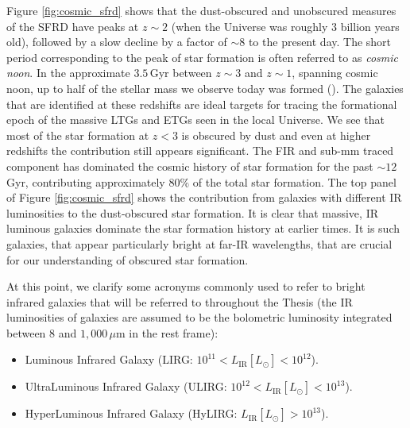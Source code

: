 Figure \ref{fig:cosmic_sfrd} shows that the dust-obscured and unobscured measures of the SFRD have peaks at $z\sim2$ (when the Universe was roughly $3$ billion years old), followed by a slow decline by a factor of $\sim 8$ to the present day. The short period corresponding to the peak of star formation is often referred to as \textit{cosmic noon}. In the approximate $3.5\,$Gyr between $z\sim3$ and $z\sim1$, spanning cosmic noon, up to half of the stellar mass we observe today was formed (\citealt{Forster-Schreiber_2020}). The galaxies that are identified at these redshifts are ideal targets for tracing the formational epoch of the massive LTGs and ETGs seen in the local Universe. We see that most of the star formation at $z < 3$ is obscured by dust and even at higher redshifts the contribution still appears significant. The FIR and sub-mm traced component has dominated the cosmic history of star formation for the past $\sim 12\,$Gyr, contributing approximately $80\%$ of the total star formation. The top panel of Figure \ref{fig:cosmic_sfrd} shows the contribution from galaxies with different IR luminosities to the dust-obscured star formation. It is clear that massive, IR luminous galaxies dominate the star formation history at earlier times. It is such galaxies, that appear particularly bright at far-IR wavelengths, that are crucial for our understanding of obscured star formation. 

At this point, we clarify some acronyms commonly used to refer to bright infrared galaxies that will be referred to throughout the Thesis (the IR luminosities of galaxies are assumed to be the bolometric luminosity integrated between $8$ and $1,000\,\mu$m in the rest frame):

\begin{itemize}
    \item Luminous Infrared Galaxy (LIRG: $10^{11} < L_\textrm{IR} [L_\odot] < 10^{12}$).
    \item UltraLuminous Infrared Galaxy (ULIRG: $10^{12} < L_\textrm{IR} [L_\odot] < 10^{13}$).
    \item HyperLuminous Infrared Galaxy (HyLIRG: $L_\textrm{IR} [L_\odot] > 10^{13}$).
\end{itemize}

